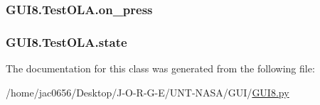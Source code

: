\subsubsection[{\texorpdfstring{on\+\_\+press}{on_press}}]{\setlength{\rightskip}{0pt plus 5cm}G\+U\+I8.\+Test\+O\+L\+A.\+on\+\_\+press\hspace{0.3cm}{\ttfamily [static]}}\hypertarget{classGUI8_1_1TestOLA_a2d2baddb978f949678551f521b9cdff0}{}\label{classGUI8_1_1TestOLA_a2d2baddb978f949678551f521b9cdff0}
\subsubsection[{\texorpdfstring{state}{state}}]{\setlength{\rightskip}{0pt plus 5cm}G\+U\+I8.\+Test\+O\+L\+A.\+state\hspace{0.3cm}{\ttfamily [static]}}\hypertarget{classGUI8_1_1TestOLA_a3556c0e8e96c798ffa4534bc266a815f}{}\label{classGUI8_1_1TestOLA_a3556c0e8e96c798ffa4534bc266a815f}


The documentation for this class was generated from the following file\+:\begin{DoxyCompactItemize}
\item 
/home/jac0656/\+Desktop/\+J-\/\+O-\/\+R-\/\+G-\/\+E/\+U\+N\+T-\/\+N\+A\+S\+A/\+G\+U\+I/\hyperlink{GUI_2GUI8_8py}{G\+U\+I8.\+py}\end{DoxyCompactItemize}

